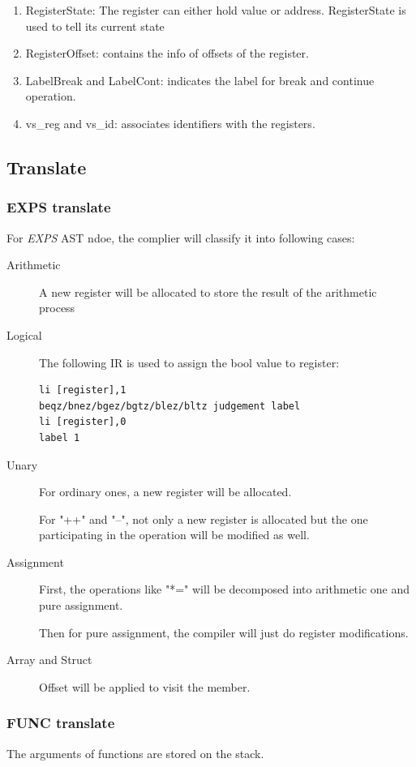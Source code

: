 \documentclass{article}
\begin{document}
\begin{enumerate}
\item
RegisterState: The register can either hold value or address. RegisterState is used to tell its current state
\item
RegisterOffset: contains the info of offsets of the register.
\item
LabelBreak and LabelCont: indicates the label for break and continue operation.
\item
vs\_reg and vs\_id:  associates identifiers with the registers.
\end{enumerate}

\subsection{Translate}
\subsubsection{EXPS translate}
For \textit{EXPS} AST ndoe, the complier will classify it into following cases:


\begin{description}
\item[Arithmetic] A new register will be allocated to store the result of the arithmetic process
\item[Logical] The following IR is used to assign the bool value to register:
\begin{lstlisting} 
li [register],1
beqz/bnez/bgez/bgtz/blez/bltz judgement label
li [register],0
label 1
\end{lstlisting}
\item[Unary] 
For ordinary ones, a new register will be allocated.

For "++" and "--", not only a new register is allocated but the one participating in the operation will be modified as well.

\item[Assignment] First, the operations like "*=" will be decomposed into arithmetic one and pure assignment.

Then for pure assignment, the compiler will just do register modifications.

\item[Array and Struct] Offset will be applied to visit the member.
\end{description}

\subsubsection{FUNC translate}
The arguments of functions are stored on the stack. 
\end{document}

